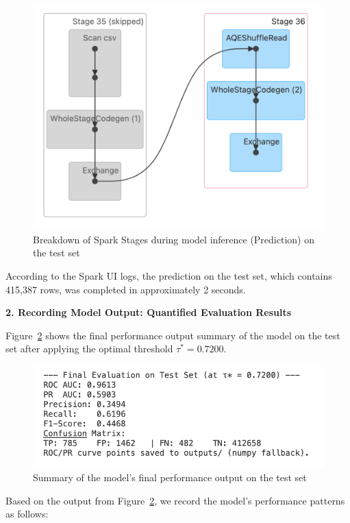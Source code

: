 \documentclass[sigplan,screen]{acmart}
\begin{document}
\begin{figure}[h]
  \centering
  \includegraphics[width=\linewidth]{Figure/7.3a.png}
  \caption{Breakdown of Spark Stages during model inference (Prediction) on the test set}
  \label{fig:inference-stages}
\end{figure}

According to the Spark UI logs, the prediction on the test set, which contains 415,387 rows, was completed in approximately 2 seconds.

\textbf{2. Recording Model Output: Quantified Evaluation Results}

Figure~\ref{fig:test-performance} shows the final performance output summary of the model on the test set after applying the optimal threshold $\tau^* = 0.7200$.

\begin{figure}[h]
  \centering
  \includegraphics[width=\linewidth]{Figure/7.3b.png}
  \caption{Summary of the model's final performance output on the test set}
  \label{fig:test-performance}
\end{figure}

Based on the output from Figure~\ref{fig:test-performance}, we record the model's performance patterns as follows:
\end{document}
